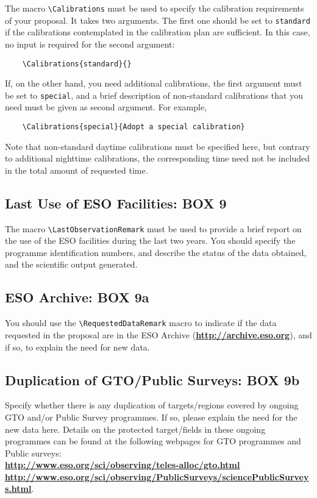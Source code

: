 \documentclass{article}
\begin{document}
The macro \verb|\Calibrations| must be used to specify the calibration
requirements of your proposal. It takes two arguments. The first one
should be set to \verb|standard| if the calibrations contemplated in
the calibration plan are sufficient. In this case, no input is
required for the second argument:
\begin{verbatim}
    \Calibrations{standard}{}
\end{verbatim} 
If, on the other hand, you need
additional calibrations, the first argument must be set to
\verb|special|, and a brief description of non-standard calibrations
that you need must be given as second argument. For example,
\begin{verbatim}
    \Calibrations{special}{Adopt a special calibration}
\end{verbatim} 
Note that non-standard
daytime calibrations must be specified here, but contrary to
additional nighttime calibrations, the corresponding time need not 
be included in the total amount of requested time. 

\subsection{Last Use of ESO Facilities: {\bf BOX 9}}
The macro \verb|\LastObservationRemark| must be used to 
provide a brief report on the use of the ESO facilities during the
last two years. You should specify the programme identification
numbers, and describe the status of the data obtained, and the 
scientific output generated.

\subsection{ESO Archive: {\bf BOX 9a}}
You should use the \verb|\RequestedDataRemark| macro to indicate if
the data requested in the proposal are in the ESO Archive
(\href{http://archive.eso.org}{\bf\underline{http://archive.eso.org}}), and if so, to explain the need for new data.

\subsection{Duplication of GTO/Public Surveys: {\bf BOX 9b}}

Specify whether there is any duplication of targets/regions covered by ongoing GTO and/or Public Survey programmes. 
If so, please explain the need for the new data here. Details on the protected target/fields in these
ongoing programmes can be found at the following webpages for GTO programmes and Public surveys: \\
\href{http://www.eso.org/sci/observing/teles-alloc/gto.html}
{\bf  \underline{http://www.eso.org/sci/observing/teles-alloc/gto.html}}\\
\href{http://www.eso.org/sci/observing/PublicSurveys/sciencePublicSurveys.html}
{\bf \underline{http://www.eso.org/sci/observing/PublicSurveys/sciencePublicSurveys.html}}.
\end{document}
